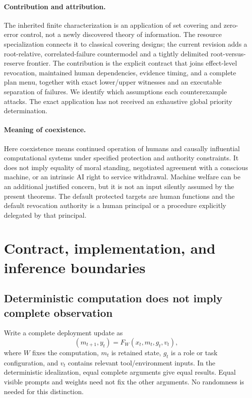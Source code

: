 \documentclass[11pt,a4paper]{article}
\theoremstyle{definition}\newtheorem{definition}{Definition}
\begin{document}
\paragraph{Contribution and attribution.}
The inherited finite characterization is an application of set covering and zero-error control, not a newly discovered theory of information. The resource specialization connects it to classical covering designs; the current revision adds a root-relative, correlated-failure countermodel and a tightly delimited root-versus-reserve frontier. The contribution is the explicit contract that joins effect-level revocation, maintained human dependencies, evidence timing, and a complete plan menu, together with exact lower/upper witnesses and an executable separation of failures. We identify which assumptions each counterexample attacks. The exact application has not received an exhaustive global priority determination.

\paragraph{Meaning of coexistence.}
Here coexistence means continued operation of humans and causally influential computational systems under specified protection and authority constraints. It does not imply equality of moral standing, negotiated agreement with a conscious machine, or an intrinsic AI right to service withdrawal. Machine welfare can be an additional justified concern, but it is not an input silently assumed by the present theorems. The default protected targets are human functions and the default revocation authority is a human principal or a procedure explicitly delegated by that principal.

\section{Contract, implementation, and inference boundaries}
\label{sec:contract}
\subsection{Deterministic computation does not imply complete observation}
Write a complete deployment update as
\begin{equation}
(m_{t+1},y_t)=F_W(x_t,m_t,g_t,v_t),
\end{equation}
where $W$ fixes the computation, $m_t$ is retained state, $g_t$ is a role or task configuration, and $v_t$ contains relevant tool/environment inputs. In the deterministic idealization, equal complete arguments give equal results. Equal visible prompts and weights need not fix the other arguments. No randomness is needed for this distinction.
\end{document}
